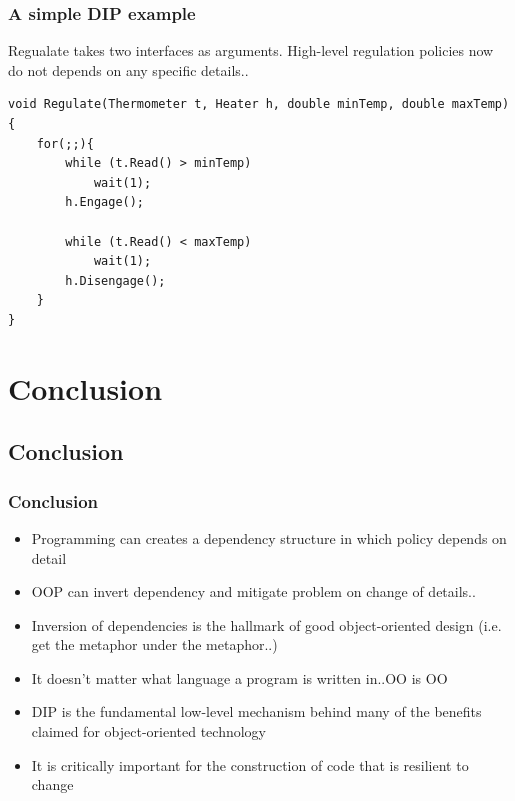 \documentclass{beamer}
\begin{document}
\begin{frame}[containsverbatim]
	\frametitle{A simple DIP example}
	Regualate takes two interfaces as arguments. High-level regulation policies now do not depends on any specific details.. \\
	\begin{lstlisting}
void Regulate(Thermometer t, Heater h, double minTemp, double maxTemp){
	for(;;){
		while (t.Read() > minTemp)
			wait(1);
		h.Engage();

		while (t.Read() < maxTemp)
			wait(1);
		h.Disengage();
	}
}
	\end{lstlisting}
\end{frame}

\section{Conclusion}
\subsection{Conclusion}
\begin{frame}
  \frametitle{Conclusion}
  \begin{itemize}
	\item<+-> Programming can creates a dependency structure in which policy depends on detail
	\item<+-> OOP can invert dependency and mitigate problem on change of details..
	\item<+-> Inversion of dependencies is the hallmark of good object-oriented design (i.e. get the metaphor under the metaphor..)
	\item<+->  It doesn't matter what language a program is written in..OO is OO
	\item<+-> DIP is the fundamental low-level mechanism behind many of the benefits claimed for object-oriented technology
	\item<+-> It is critically important for the construction of code that is resilient to change
   \end{itemize}
\end{frame}
\end{document}
